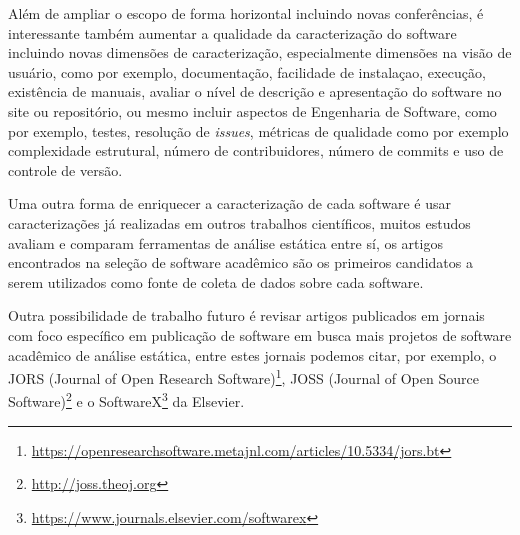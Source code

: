 Além de ampliar o escopo de forma horizontal incluindo novas conferências, é
interessante também aumentar a qualidade da caracterização do software
incluindo novas dimensões de caracterização, especialmente dimensões na visão
de usuário, como por exemplo, documentação, facilidade de instalaçao, execução,
existência de manuais, avaliar o nível de descrição e apresentação do software
no site ou repositório, ou mesmo incluir aspectos de Engenharia de Software,
como por exemplo, testes, resolução de {\it issues}, métricas de qualidade como
por exemplo complexidade estrutural, número de contribuidores, número de
commits e uso de controle de versão.


Uma outra forma de enriquecer a caracterização de cada software é usar
caracterizações já realizadas em outros trabalhos científicos, muitos estudos
avaliam e comparam ferramentas de análise estática entre sí, os artigos
encontrados na seleção de software acadêmico são os primeiros candidatos a
serem utilizados como fonte de coleta de dados sobre cada software.



Outra possibilidade de trabalho futuro é revisar artigos publicados em jornais
com foco específico em publicação de software em busca mais projetos de
software acadêmico de análise estática, entre estes jornais podemos citar, por
exemplo, o JORS (Journal of Open Research
Software)\footnote{\url{https://openresearchsoftware.metajnl.com/articles/10.5334/jors.bt}},
JOSS (Journal of Open Source Software)\footnote{\url{http://joss.theoj.org}} e
o SoftwareX\footnote{\url{https://www.journals.elsevier.com/softwarex}} da
Elsevier. 

%
%
